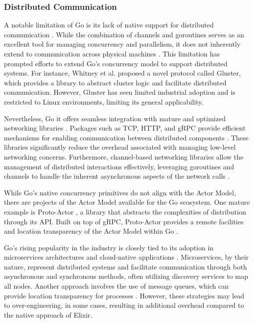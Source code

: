 \subsubsection{Distributed Communication}

A notable limitation of Go is its lack of native support for distributed communication \cite{Whitney2019, Cox-Buday2017}. While the combination of channels and goroutines serves as an excellent tool for managing concurrency and parallelism, it does not inherently extend to communication across physical machines \cite{Kennedy2016}. This limitation has prompted efforts to extend Go’s concurrency model to support distributed systems. For instance, Whitney et al. \cite{Whitney2019} proposed a novel protocol called Gluster, which provides a library to abstract cluster logic and facilitate distributed communication. However, Gluster has seen limited industrial adoption and is restricted to Linux environments, limiting its general applicability.

Nevertheless, Go it offers seamless integration with mature and optimized networking libraries \cite{Kennedy2016}. Packages such as \gls{TCP}, \gls{HTTP}, and \gls{gRPC} provide efficient mechanisms for enabling communication between distributed components \cite{Castro2019, go-docs}. These libraries significantly reduce the overhead associated with managing low-level networking concerns. Furthermore, channel-based networking libraries allow the management of distributed interactions effectively, leveraging goroutines and channels to handle the inherent asynchronous aspects of the network calls \cite{Castro2019}.

While Go’s native concurrency primitives do not align with the Actor Model, there are projects of the Actor Model available for the Go ecosystem. One mature example is Proto-Actor \cite{Whitney2019,proto-actor-docs}, a library that abstracts the complexities of distribution through its \gls{API}. Built on top of \gls{gRPC}, Proto-Actor provides a remote facilities and location transparency of the Actor Model within Go \cite{proto-actor-docs}.

Go’s rising popularity in the industry is closely tied to its adoption in microservices architectures and cloud-native applications \cite{Zhao2023,Shuiskov2022}. Microservices, by their nature, represent distributed systems and facilitate communication through both asynchronous and synchronous methods, often utilizing discovery services to map all nodes. Another approach involves the use of message queues, which can provide location transparency for processes \cite{Shuiskov2022}. However, these strategies may lead to over-engineering, in some cases, resulting in additional overhead compared to the native approach of Elixir.

